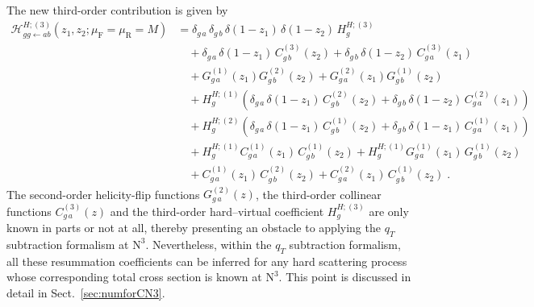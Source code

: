 \documentclass[12pt]{article}
\DeclareRobustCommand{\nn}{\nonumber}
\DeclareRobustCommand{\mur}{\ensuremath{\mu_{\mathrm{R}}}\xspace}
\DeclareRobustCommand{\muf}{\ensuremath{\mu_{\mathrm{F}}}\xspace}
\DeclareRobustCommand{\qt}{\ensuremath{q_T}\xspace}
\DeclareRobustCommand{\cH}{\ensuremath{\mathcal{H}}}
\DeclareRobustCommand{\LO}{\text{LO}\xspace}
\DeclareRobustCommand{\N}[1]{\ensuremath{\text{N}^{#1}}} %
\begin{document}
The new third-order contribution is given by
\begin{align}
  \cH^{H;(3)}_{gg\gets ab}(z_1,z_2; \muf=\mur=M)
  &=
  \delta_{g\,a} \,\delta_{g\,b} \,\delta(1-z_1)\,\delta(1-z_2)\,H^{H;(3)}_g
  \nn\\&\quad
  +\delta_{g\,a} \,\delta(1-z_1)\,C^{(3)}_{g\,b}(z_2)
  +\delta_{g\,b} \,\delta(1-z_2)\,C^{(3)}_{g\,a}(z_1)
  \nn\\&\quad
  +G^{(1)}_{g\,a}(z_1) G^{(2)}_{g\,b}(z_2)
  +G^{(2)}_{g\,a}(z_1) G^{(1)}_{g\,b}(z_2)
  \nn\\&\quad
  +H^{H;(1)}_g\left(
  \delta_{g\,a} \,\delta(1-z_1) \,C^{(2)}_{g\,b}(z_2) +
  \delta_{g\,b} \,\delta(1-z_2) \,C^{(2)}_{g\,a}(z_1)
  \right) 
  \nn\\&\quad
  +H^{H;(2)}_g\left(
  \delta_{g\,a} \,\delta(1-z_1) \,C^{(1)}_{g\,b}(z_2) +
  \delta_{g\,b} \,\delta(1-z_1) \,C^{(1)}_{g\,a}(z_1)
  \right)
  \nn\\&\quad
  + H^{H;(1)}_g  C^{(1)}_{g\,a}(z_1) \, C^{(1)}_{g\,b}(z_2) 
  + H^{H;(1)}_g  G^{(1)}_{g\,a}(z_1) \, G^{(1)}_{g\,b}(z_2) 
  \nn\\&\quad
  + C^{(1)}_{g\,a}(z_1) \, C^{(2)}_{g\,b}(z_2)
  + C^{(2)}_{g\,a}(z_1) \, C^{(1)}_{g\,b}(z_2) \;.
  \label{H3}
\end{align}
The second-order helicity-flip functions $G^{(2)}_{g\,a}(z)$, the third-order collinear functions $C^{(3)}_{g\,a}(z)$ and the third-order hard--virtual coefficient $H^{H;(3)}_g$ are only known in parts or not at all, thereby presenting an obstacle to applying the $\qt$ subtraction formalism at \N3\LO.
Nevertheless, within the $\qt$ subtraction  formalism, all these resummation coefficients can be inferred for any hard scattering process whose corresponding total cross section is known at \N3\LO. 
This point is discussed in detail in Sect.~\ref{sec:numforCN3}.
\end{document}
